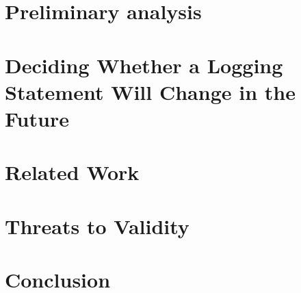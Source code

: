 %

\section{Preliminary analysis}

\label{analysis}



\section{Deciding Whether a Logging Statement Will Change in the Future}
%
\label{prediction}




\section{Related Work }
\label{related}


\section{Threats to Validity}
\label{threats}


\section{Conclusion}
\label{conc}











